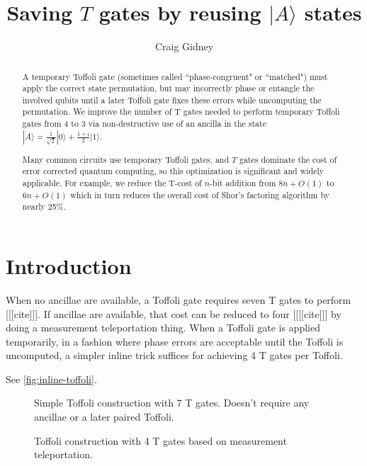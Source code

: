 \documentclass[twocolumn,longbibliography]{quantumarticle-customized}
\title{Saving $T$ gates by reusing $|A\rangle$ states}
\author{Craig Gidney}
\affiliation{Google, Santa Barbara, CA 93117, USA}
\begin{document}
\maketitle

\begin{abstract}
A temporary Toffoli gate (sometimes called ``phase-congruent" or ``matched") must apply the correct state permutation, but may incorrectly phase or entangle the involved qubits until a later Toffoli gate fixes these errors while uncomputing the permutation.
We improve the number of T gates needed to perform temporary Toffoli gates from 4 to 3 via non-destructive use of an ancilla in the state $|A\rangle = \frac{1}{\sqrt{2}} |0\rangle + \frac{1+i}{2} |1\rangle$.

Many common circuits use temporary Toffoli gates, and $T$ gates dominate the cost of error corrected quantum computing, so this optimization is significant and widely applicable.
For example, we reduce the T-cost of $n$-bit addition from $8n + O(1)$ to $6n + O(1)$ which in turn reduces the overall cost of Shor's factoring algorithm by nearly 25\%.
\end{abstract}

\section{Introduction} \label{sec:introduction}

When no ancillae are available, a Toffoli gate requires seven T gates to perform [[[cite]]].
If ancillae are available, that cost can be reduced to four [[[[cite]]] by doing a measurement teleportation thing.
When a Toffoli gate is applied temporarily, in a fashion where phase errors are acceptable until the Toffoli is uncomputed, a simpler inline trick suffices for achieving 4 T gates per Toffoli.




See \autoref{fig:inline-toffoli}.

\begin{figure}
  \centering
  \makebox[\linewidth]{
  }
  \caption{
	Simple Toffoli construction with 7 T gates.
	Doesn't require any ancillae or a later paired Toffoli.
  }
  \label{fig:inline-toffoli}
\end{figure}

\begin{figure}
  \centering
  \makebox[\linewidth]{
  }
  \caption{
	Toffoli construction with 4 T gates based on measurement teleportation.
  }
  \label{fig:ancilla-toffoli}
\end{figure}
\end{document}
